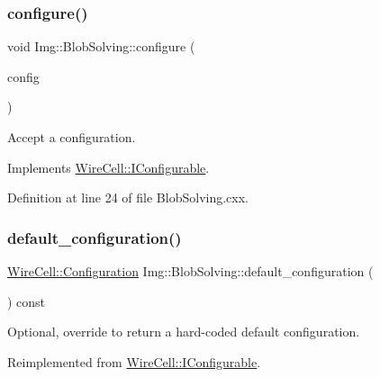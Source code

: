 \subsubsection{\texorpdfstring{configure()}{configure()}}
{\footnotesize\ttfamily void Img\+::\+Blob\+Solving\+::configure (\begin{DoxyParamCaption}\item[{const \hyperlink{namespace_wire_cell_a9f705541fc1d46c608b3d32c182333ee}{Wire\+Cell\+::\+Configuration} \&}]{config }\end{DoxyParamCaption})\hspace{0.3cm}{\ttfamily [virtual]}}



Accept a configuration. 



Implements \hyperlink{class_wire_cell_1_1_i_configurable_a57ff687923a724093df3de59c6ff237d}{Wire\+Cell\+::\+I\+Configurable}.



Definition at line 24 of file Blob\+Solving.\+cxx.

\mbox{\label{class_wire_cell_1_1_img_1_1_blob_solving_a59d264243d5395add0898a428405a613}} 
\subsubsection{\texorpdfstring{default\+\_\+configuration()}{default\_configuration()}}
{\footnotesize\ttfamily \hyperlink{namespace_wire_cell_a9f705541fc1d46c608b3d32c182333ee}{Wire\+Cell\+::\+Configuration} Img\+::\+Blob\+Solving\+::default\+\_\+configuration (\begin{DoxyParamCaption}{ }\end{DoxyParamCaption}) const\hspace{0.3cm}{\ttfamily [virtual]}}



Optional, override to return a hard-\/coded default configuration. 



Reimplemented from \hyperlink{class_wire_cell_1_1_i_configurable_a54841b2da3d1ea02189478bff96f7998}{Wire\+Cell\+::\+I\+Configurable}.



